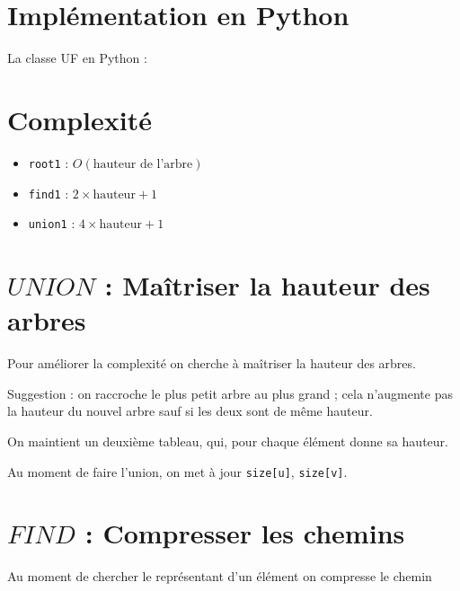 \section{Implémentation en Python}

La classe UF en Python :



\section{Complexité}

\begin{itemize}
	\item \texttt{root1} : $O(\text{hauteur de l'arbre})$
	\item \texttt{find1} : $2 \times \text{hauteur} + 1$
	\item \texttt{union1} : $4 \times \text{hauteur} + 1$
\end{itemize}


\section{$UNION$ : Maîtriser la hauteur des arbres}
Pour améliorer la complexité on cherche à maîtriser la hauteur des arbres.

Suggestion : on raccroche le plus petit arbre au plus grand ; cela n'augmente pas la hauteur du nouvel arbre sauf si les deux sont de même hauteur.

On maintient un deuxième tableau, qui, pour chaque élément donne sa hauteur.

Au moment de faire l'union, on met à jour \texttt{size[u]}, \texttt{size[v]}.




\section{$FIND$ : Compresser les chemins}

Au moment de chercher le représentant d'un élément on compresse le chemin



